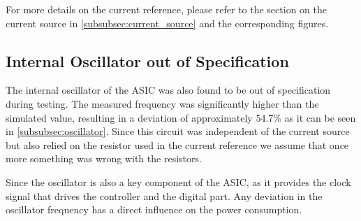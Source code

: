 For more details on the current reference, please refer to the section on the current source in \autoref{subsubsec:current_source} and the corresponding figures.

\subsection{Internal Oscillator out of Specification}
The internal oscillator of the \ac{ASIC} was also found to be out of specification during testing. The measured frequency was significantly higher than the simulated value, resulting in a deviation of approximately 54.7\% as it can be seen in \autoref{subsubsec:oscillator}. Since this circuit was independent of the current source but also relied on the resistor used in the current reference we assume that once more something was wrong with the resistors.

Since the oscillator is also a key component of the \ac{ASIC}, as it provides the clock signal that drives the controller and the digital part. Any deviation in the oscillator frequency has a direct influence on the power consumption.
